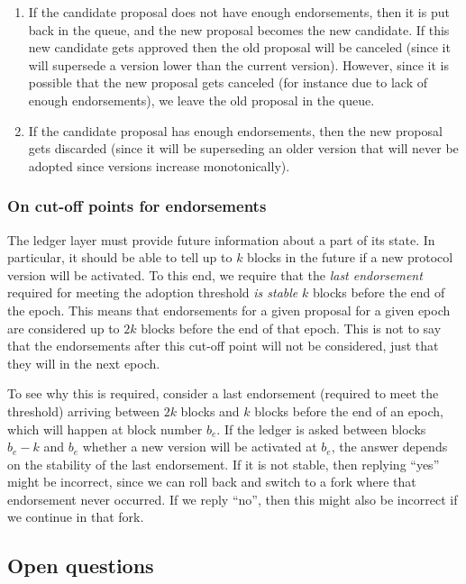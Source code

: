 \begin{enumerate}
\item If the candidate proposal does not have enough endorsements, then it is
  put back in the queue, and the new proposal becomes the new candidate. If this
  new candidate gets approved then the old proposal will be canceled (since it
  will supersede a version lower than the current version). However, since it is
  possible that the new proposal gets canceled (for instance due to lack of
  enough endorsements), we leave the old proposal in the queue.
\item If the candidate proposal has enough endorsements, then the new proposal
  gets discarded (since it will be superseding an older version that will never
  be adopted since versions increase monotonically).
\end{enumerate}

\subsubsection{On cut-off points for endorsements}
\label{sec:on-cutoff-points-for-endorsements}

The ledger layer must provide future information about a part of its state. In
particular, it should be able to tell up to $k$ blocks in the future if a
new protocol version will be activated. To this end, we require that the
\emph{last endorsement} required for meeting the adoption threshold \emph{is
  stable} $k$ blocks before the end of the epoch. This means that
endorsements for a given proposal for a given epoch are considered up to
$2k$ blocks before the end of that epoch. This is not to say that the
endorsements after this cut-off point will not be considered, just that they
will in the next epoch.

To see why this is required, consider a last endorsement (required to meet the
threshold) arriving between $2k$ blocks and $k$ blocks before the end of an
epoch, which will happen at block number $b_e$. If the ledger is asked between
blocks $b_e - k$ and $b_e$ whether a new version will be activated at $b_e$, the
answer depends on the stability of the last endorsement. If it is not stable,
then replying ``yes'' might be incorrect, since we can roll back and switch to a
fork where that endorsement never occurred. If we reply ``no'', then this might
also be incorrect if we continue in that fork.

\subsection{Open questions}
\label{sec:open-questions}

